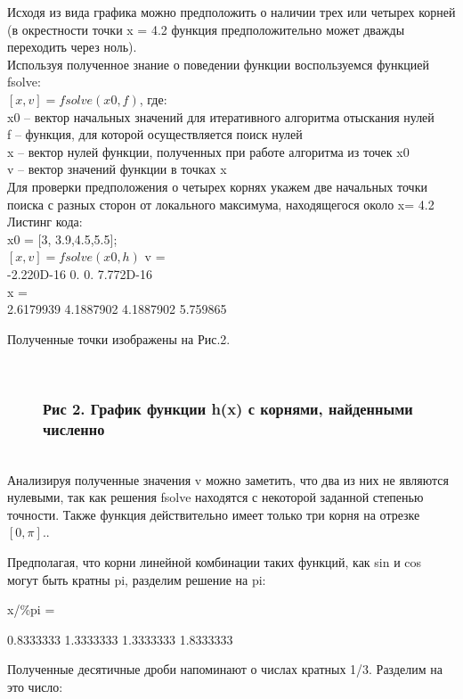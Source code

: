 \documentclass[russian,utf8,nocolumnxxxi,nocolumnxxxii]{eskdtext}
\begin{document}
Исходя из вида графика можно предположить о наличии трех или четырех корней (в окрестности точки x = 4.2 функция предположительно может дважды переходить через ноль).
\\Используя полученное знание о поведении функции воспользуемся функцией fsolve:
\\$[x,v] = fsolve(x0,f)$, где:
\\x0 – вектор начальных значений для итеративного алгоритма отыскания нулей
\\f – функция, для которой осуществляется поиск нулей
\\x – вектор нулей функции, полученных при работе алгоритма из точек x0
\\v – вектор значений функции в точках x
\\Для проверки предположения о четырех корнях укажем две начальных точки поиска с разных сторон от локального максимума, находящегося около x= 4.2
\\Листинг кода:
\\x0 = [3, 3.9,4.5,5.5];
\\$[x,v] = fsolve(x0,h)$
\newpage
v =\\
-2.220D-16 0. 0. 7.772D-16\\
x =\\
2.6179939 4.1887902 4.1887902 5.759865

Полученные точки изображены на Рис.2.
\begin{figure}[H]
\begin{center}
\begin{minipage}[h]{0.65\linewidth}
  \\
\frametitle{Рис 2. График функции h(x) с корнями, найденными численно}
\end{minipage}
\end{center}
\end{figure}

\\Анализируя полученные значения v можно заметить, что два из них не являются нулевыми, так как решения fsolve находятся с некоторой заданной степенью точности. Также функция действительно имеет только три корня на отрезке $[0,\pi]$..

Предполагая, что корни линейной комбинации таких функций, как sin и cos могут быть кратны pi, разделим решение на pi:

x/\%pi =

0.8333333 1.3333333 1.3333333 1.8333333

Полученные десятичные дроби напоминают о числах кратных 1/3. Разделим на это число:
\end{document}
